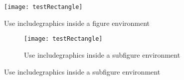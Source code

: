 \documentclass[twocolumn]{article}
\begin{document}
	\begin{figure}
		\centering
		\texttt{[image: testRectangle]}%
		\caption{Use includegraphics inside a figure environment}
	\end{figure}
	\begin{figure}
		\begin{subfigure}{\linewidth}
			\centering
			\texttt{[image: testRectangle]}%
			\caption{Use includegraphics inside a subfigure environment}
		\end{subfigure}
	\end{figure}
\end{document}
